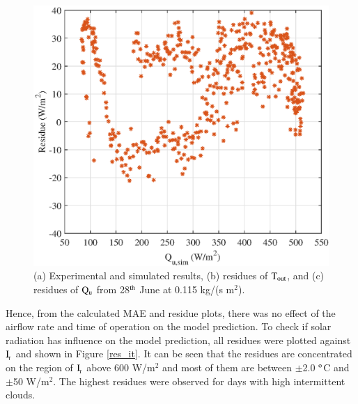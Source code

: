 \begin{figure}[ht!]
\begin{minipage}{0.39\columnwidth}
		\includegraphics[scale=0.5,width=1.0\columnwidth]{figs/0115-residue-6.eps}
	\end{minipage}
	
	\caption{(a) Experimental and simulated results, (b) residues of $\rm{T_{out}}$, and (c) residues of $\rm{Q_{u}}$ from 28$^{\rm{th}}$ June at 0.115 kg/(s m$^2$).}
	\label{0115-3}
\end{figure}


Hence, from the calculated MAE and residue plots, there was no effect of the airflow rate and time of operation on the model prediction. To check if solar radiation has influence on the model prediction, all residues were plotted against $\rm{I_{\!_T}}$ and shown in Figure \ref{res_it}. It can be seen that the residues are concentrated on the region of $\rm{I_{\!_T}}$ above 600 W/m$^2$ and most of them are between $\pm$2.0 $^{\rm{o}}$C and $\pm$50 W/m$^2$. The highest residues were observed for days with high intermittent clouds.

